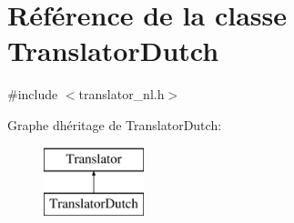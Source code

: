 \hypertarget{class_translator_dutch}{}\section{Référence de la classe Translator\+Dutch}
\label{class_translator_dutch}


{\ttfamily \#include $<$translator\+\_\+nl.\+h$>$}

Graphe d\textquotesingle{}héritage de Translator\+Dutch\+:\begin{figure}[H]
\begin{center}
\leavevmode
\includegraphics[height=2.000000cm]{class_translator_dutch}
\end{center}
\end{figure}
